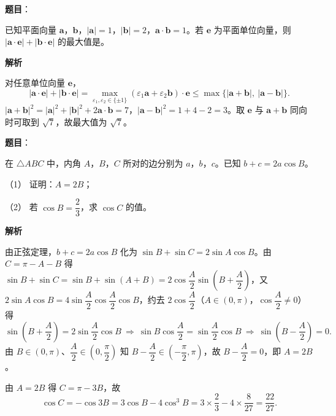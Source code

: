 \begin{answer}

\textbf{题目}：

已知平面向量 \(\boldsymbol{a}\)，\(\boldsymbol{b}\)，\(|\boldsymbol{a}|=1\)，\(|\boldsymbol{b}|=2\)，\(\boldsymbol{a}\cdot\boldsymbol{b}=1\)。若 \(\boldsymbol{e}\) 为平面单位向量，则 \(|\boldsymbol{a}\cdot\boldsymbol{e}|+|\boldsymbol{b}\cdot\boldsymbol{e}|\) 的最大值是\gkblank{}。

\textbf{解析}

对任意单位向量 \(\boldsymbol{e}\)，
\nopagebreak[4]
\[
|\boldsymbol{a}\cdot\boldsymbol{e}|+|\boldsymbol{b}\cdot\boldsymbol{e}|=\max_{\varepsilon_{1},\varepsilon_{2}\in\{\pm1\}}(\varepsilon_{1}\boldsymbol{a}+\varepsilon_{2}\boldsymbol{b})\cdot\boldsymbol{e}\leqslant\max\{|\boldsymbol{a}+\boldsymbol{b}|,\ |\boldsymbol{a}-\boldsymbol{b}|\}.
\]
\(|\boldsymbol{a}+\boldsymbol{b}|^{2}=|\boldsymbol{a}|^{2}+|\boldsymbol{b}|^{2}+2\boldsymbol{a}\cdot\boldsymbol{b}=7\)，\(|\boldsymbol{a}-\boldsymbol{b}|^{2}=1+4-2=3\)。取 \(\boldsymbol{e}\) 与 \(\boldsymbol{a}+\boldsymbol{b}\) 同向时可取到 \(\sqrt{7}\)，故最大值为 \(\sqrt{7}\)。


\end{answer}
\begin{answer}

\textbf{题目}：

在 \(\triangle ABC\) 中，内角 \(A\)，\(B\)，\(C\) 所对的边分别为 \(a\)，\(b\)，\(c\)。已知 \(b+c=2a\cos B\)。

（1） 证明：\(A=2B\)；

（2） 若 \(\cos B=\dfrac{2}{3}\)，求 \(\cos C\) 的值。

\textbf{解析}


由正弦定理，\(b+c=2a\cos B\) 化为 \(\sin B+\sin C=2\sin A\cos B\)。由 \(C=\pi-A-B\) 得 \(\sin B+\sin C=\sin B+\sin(A+B)=2\cos\dfrac{A}{2}\sin\left(B+\dfrac{A}{2}\right)\)，又 \(2\sin A\cos B=4\sin\dfrac{A}{2}\cos\dfrac{A}{2}\cos B\)，约去 \(2\cos\dfrac{A}{2}\)（\(A\in(0,\pi)\)，\(\cos\dfrac{A}{2}\neq0\)）得
\nopagebreak[4]
\[
\sin\left(B+\frac{A}{2}\right)=2\sin\frac{A}{2}\cos B
\ \Longrightarrow\
\sin B\cos\frac{A}{2}=\sin\frac{A}{2}\cos B
\ \Longrightarrow\
\sin\left(B-\frac{A}{2}\right)=0.
\]
由 \(B\in(0,\pi)\)、\(\dfrac{A}{2}\in\left(0,\dfrac{\pi}{2}\right)\) 知 \(B-\dfrac{A}{2}\in\left(-\dfrac{\pi}{2},\pi\right)\)，故 \(B-\dfrac{A}{2}=0\)，即 \(A=2B\)。

\gksubpart{(2)}

由 \(A=2B\) 得 \(C=\pi-3B\)，故
\nopagebreak[4]
\[
\cos C=-\cos 3B=3\cos B-4\cos^{3}B=3\times\frac{2}{3}-4\times\frac{8}{27}=\frac{22}{27}.
\]



\end{answer}
